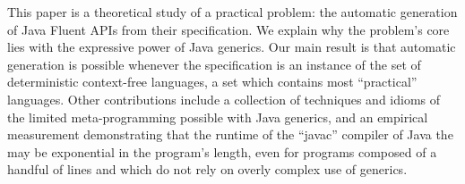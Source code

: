 This paper is a theoretical study of a practical problem:
  the automatic generation of Java Fluent APIs from their specification.
We explain why the problem's core lies with 
  the expressive power of Java generics.
Our main result is that automatic generation is possible whenever 
  the specification is an instance of the set of deterministic context-free languages,
  a set which contains most ``practical'' languages.
Other contributions include a collection of techniques and idioms of
  the limited meta-programming possible with Java generics, 
  and an empirical measurement demonstrating that the runtime of
  the ``javac'' compiler of Java the may be exponential in
  the program's length, even for programs composed of 
  a handful of lines and which do not rely on overly 
  complex use of generics.
